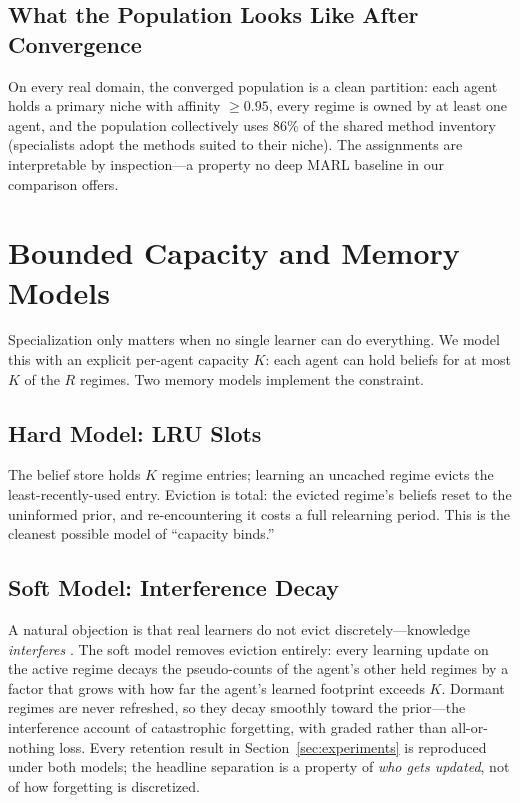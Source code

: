 \documentclass[10pt]{article}
\begin{document}
\subsection{What the Population Looks Like After Convergence}

On every real domain, the converged population is a clean partition: each agent
holds a primary niche with affinity $\ge 0.95$, every regime is owned by at
least one agent, and the population collectively uses $86\%$ of the shared
method inventory (specialists adopt the methods suited to their niche). The
assignments are interpretable by inspection---a property no deep MARL baseline
in our comparison offers.

\section{Bounded Capacity and Memory Models}
\label{sec:capacity}

Specialization only matters when no single learner can do everything. We model
this with an explicit per-agent capacity $K$: each agent can hold beliefs for at
most $K$ of the $R$ regimes. Two memory models implement the constraint.

\subsection{Hard Model: LRU Slots}

The belief store holds $K$ regime entries; learning an uncached regime evicts
the least-recently-used entry. Eviction is total: the evicted regime's beliefs
reset to the uninformed prior, and re-encountering it costs a full relearning
period. This is the cleanest possible model of ``capacity binds.''

\subsection{Soft Model: Interference Decay}

A natural objection is that real learners do not evict discretely---knowledge
\emph{interferes} \cite{french1999catastrophic}. The soft model removes
eviction entirely: every learning
update on the active regime decays the pseudo-counts of the agent's other held
regimes by a factor that grows with how far the agent's learned footprint
exceeds $K$. Dormant regimes are never refreshed, so they decay smoothly toward
the prior---the interference account of catastrophic forgetting, with graded
rather than all-or-nothing loss. Every retention result in
Section~\ref{sec:experiments} is reproduced under both models; the headline
separation is a property of \emph{who gets updated}, not of how forgetting is
discretized.
\end{document}
